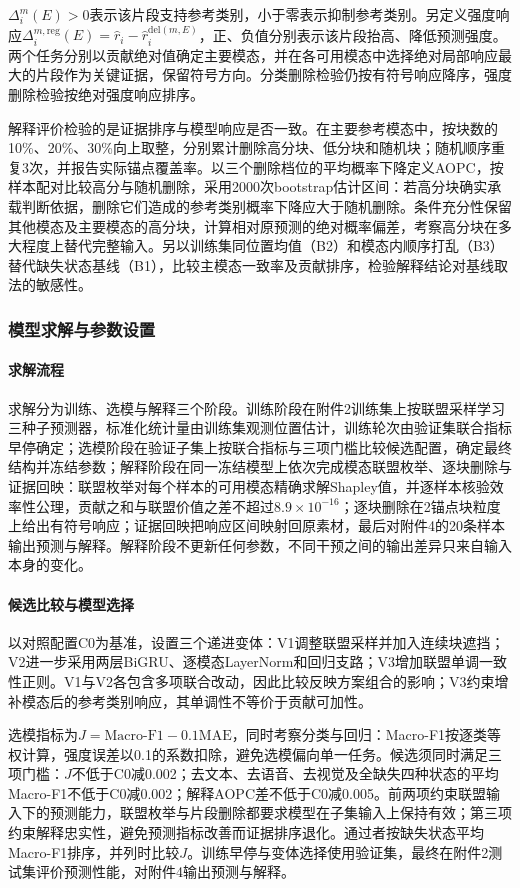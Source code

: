 $\Delta_i^m(E)>0$表示该片段支持参考类别，小于零表示抑制参考类别。另定义强度响应$\Delta_i^{m,\mathrm{reg}}(E)=\hat r_i-\hat r_i^{\mathrm{del}(m,E)}$，正、负值分别表示该片段抬高、降低预测强度。两个任务分别以贡献绝对值确定主要模态，并在各可用模态中选择绝对局部响应最大的片段作为关键证据，保留符号方向。分类删除检验仍按有符号响应降序，强度删除检验按绝对强度响应排序。

解释评价检验的是证据排序与模型响应是否一致。在主要参考模态中，按块数的10\%、20\%、30\%向上取整，分别累计删除高分块、低分块和随机块；随机顺序重复3次，并报告实际锚点覆盖率。以三个删除档位的平均概率下降定义AOPC，按样本配对比较高分与随机删除，采用2000次bootstrap估计区间：若高分块确实承载判断依据，删除它们造成的参考类别概率下降应大于随机删除。条件充分性保留其他模态及主要模态的高分块，计算相对原预测的绝对概率偏差，考察高分块在多大程度上替代完整输入。另以训练集同位置均值（B2）和模态内顺序打乱（B3）替代缺失状态基线（B1），比较主模态一致率及贡献排序，检验解释结论对基线取法的敏感性。

\FloatBarrier
\subsubsection{模型求解与参数设置}
\FloatBarrier
\paragraph{求解流程}
求解分为训练、选模与解释三个阶段。训练阶段在附件2训练集上按联盟采样学习三种子预测器，标准化统计量由训练集观测位置估计，训练轮次由验证集联合指标早停确定；选模阶段在验证子集上按联合指标与三项门槛比较候选配置，确定最终结构并冻结参数；解释阶段在同一冻结模型上依次完成模态联盟枚举、逐块删除与证据回映：联盟枚举对每个样本的可用模态精确求解Shapley值，并逐样本核验效率性公理，贡献之和与联盟价值之差不超过$8.9\times10^{-16}$；逐块删除在2锚点块粒度上给出有符号响应；证据回映把响应区间映射回原素材，最后对附件4的20条样本输出预测与解释。解释阶段不更新任何参数，不同干预之间的输出差异只来自输入本身的变化。

\paragraph{候选比较与模型选择}
以对照配置C0为基准，设置三个递进变体：V1调整联盟采样并加入连续块遮挡；V2进一步采用两层BiGRU、逐模态LayerNorm和回归支路；V3增加联盟单调一致性正则。V1与V2各包含多项联合改动，因此比较反映方案组合的影响；V3约束增补模态后的参考类别响应，其单调性不等价于贡献可加性。

选模指标为$J=\mathrm{Macro\mbox{-}F1}-0.1\mathrm{MAE}$，同时考察分类与回归：Macro-F1按逐类等权计算，强度误差以0.1的系数扣除，避免选模偏向单一任务。候选须同时满足三项门槛：$J$不低于C0减0.002；去文本、去语音、去视觉及全缺失四种状态的平均Macro-F1不低于C0减0.002；解释AOPC差不低于C0减0.005。前两项约束联盟输入下的预测能力，联盟枚举与片段删除都要求模型在子集输入上保持有效；第三项约束解释忠实性，避免预测指标改善而证据排序退化。通过者按缺失状态平均Macro-F1排序，并列时比较$J$。训练早停与变体选择使用验证集，最终在附件2测试集评价预测性能，对附件4输出预测与解释。

